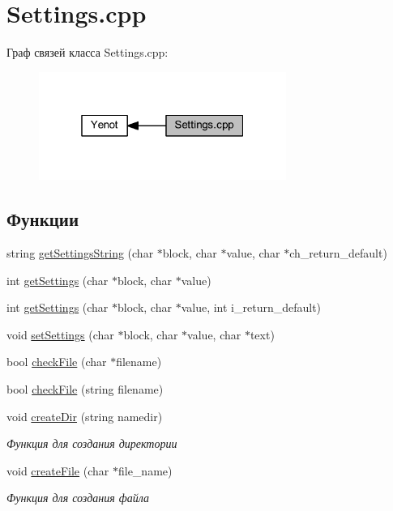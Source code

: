 \hypertarget{group__settingscpp}{}\section{Settings.\+cpp}
\label{group__settingscpp}
Граф связей класса Settings.\+cpp\+:\nopagebreak
\begin{figure}[H]
\begin{center}
\leavevmode
\includegraphics[width=229pt]{group__settingscpp}
\end{center}
\end{figure}
\subsection*{Функции}
\begin{DoxyCompactItemize}
\item 
string \mbox{\hyperlink{group__settingscpp_ga50535cebf45c8d7cbffd29274699e5f5}{get\+Settings\+String}} (char $\ast$block, char $\ast$value, char $\ast$ch\+\_\+return\+\_\+default)
\item 
int \mbox{\hyperlink{group__settingscpp_ga68b4d9ed6be7aaa93d9a6fe8fd683862}{get\+Settings}} (char $\ast$block, char $\ast$value)
\item 
int \mbox{\hyperlink{group__settingscpp_ga0a2fe94de4037eda33c49fe332970891}{get\+Settings}} (char $\ast$block, char $\ast$value, int i\+\_\+return\+\_\+default)
\item 
void \mbox{\hyperlink{group__settingscpp_ga463e32ccb37f9478b0e62ee0d21c5999}{set\+Settings}} (char $\ast$block, char $\ast$value, char $\ast$text)
\item 
bool \mbox{\hyperlink{group__settingscpp_ga2dd1bc039652a0480c444957d416b6a6}{check\+File}} (char $\ast$filename)
\item 
bool \mbox{\hyperlink{group__settingscpp_ga64f8c9899c815dc180b2b564c0d05762}{check\+File}} (string filename)
\item 
void \mbox{\hyperlink{group__settingscpp_ga5ac0cd45ecb6e65e3ace40687d6ee8bc}{create\+Dir}} (string namedir)
\begin{DoxyCompactList}\small\item\em Функция для создания директории \end{DoxyCompactList}\item 
void \mbox{\hyperlink{group__settingscpp_ga8f34a2030acfb5567678ab2bba25f3c1}{create\+File}} (char $\ast$file\+\_\+name)
\begin{DoxyCompactList}\small\item\em Функция для создания файла \end{DoxyCompactList}\end{DoxyCompactItemize}


